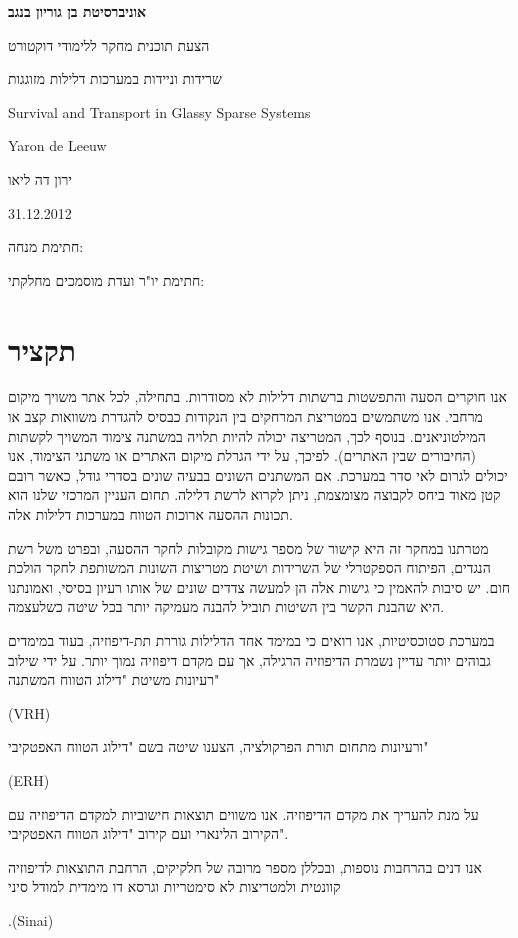 \documentclass[onecolumn,fleqn,12pt,openany,a4paper,longbibliography,oneside]{book}
\begin{document}
{\setlength{\parindent}{0cm}
\begin{center}

{\Huge\bfseries
אוניברסיטת בן גוריון בנגב


הצעת תוכנית מחקר ללימודי דוקטורט
\vspace{6em}



שרידות וניידות במערכות דלילות מזוגגות




\begin{english}

Survival and Transport in Glassy Sparse Systems

\vspace{2em}

Yaron de Leeuw
\end{english}

ירון דה ליאו


31.12.2012

}%
\end{center}
\vspace{8em}

חתימת מנחה: 
\underline{\hspace{20ex}}


חתימת יו"ר ועדת מוסמכים מחלקתי:
\underline{\hspace{20ex}}
}%
\newpage
\section*{תקציר}
אנו חוקרים הסעה והתפשטות ברשתות דלילות לא מסודרות. בתחילה, לכל אתר משויך מיקום מרחבי. 
אנו משתמשים במטריצת המרחקים בין הנקודות כבסיס להגדרת משוואות קצב או המילטוניאנים.
בנוסף לכך, המטריצה יכולה להיות תלויה במשתנה צימוד המשויך לקשתות (החיבורים שבין האתרים).
לפיכך, על ידי הגרלת מיקום האתרים או משתני הצימוד, אנו יכולים לגרום לאי סדר במערכת.
אם המשתנים השונים בבעיה שונים בסדרי גודל, כאשר רובם קטן מאוד ביחס לקבוצה מצומצמת, 
ניתן לקרוא לרשת דלילה. תחום העניין המרכזי שלנו הוא תכונות ההסעה ארוכות הטווח במערכות דלילות אלה.


מטרתנו במחקר זה היא קישור של מספר גישות מקובלות לחקר ההסעה,
ובפרט משל רשת הנגדים, הפיתוח הספקטרלי של השרידות
ושיטת מטריצות השונות המשותפת לחקר הולכת חום.
יש סיבות להאמין כי גישות אלה הן למעשה צדדים שונים
של אותו רעיון בסיסי, ואמונתנו היא שהבנת הקשר בין השיטות
תוביל להבנה מעמיקה יותר בכל שיטה כשלעצמה.


במערכת סטוכסיטיות, אנו
רואים כי במימד אחד הדלילות גוררת תת-דיפוזיה,
בעוד במימדים גבוהים יותר עדיין נשמרת הדיפוזיה הרגילה,
אך עם מקדם דיפוזיה נמוך יותר.
על ידי שילוב רעיונות משיטת "דילוג הטווח המשתנה" 
\begin{english}
(VRH)
\end{english}
ורעיונות מתחום תורת הפרקולציה,
הצענו שיטה בשם "דילוג הטווח האפטקיבי"
\begin{english}
(ERH)
\end{english}
 על מנת להעריך את מקדם הדיפוזיה.
אנו משווים תוצאות חישוביות למקדם הדיפוזיה עם הקירוב הלינארי ועם קירוב "דילוג הטווח האפטקיבי".



אנו דנים בהרחבות נוספות, ובכללן מספר מרובה של חלקיקים, 
הרחבת התוצאות לדיפוזיה קוונטית ולמטריצות לא סימטריות
וגרסא דו מימדית למודל סיני
\begin{english}
.(Sinai)
\end{english}
\end{document}
